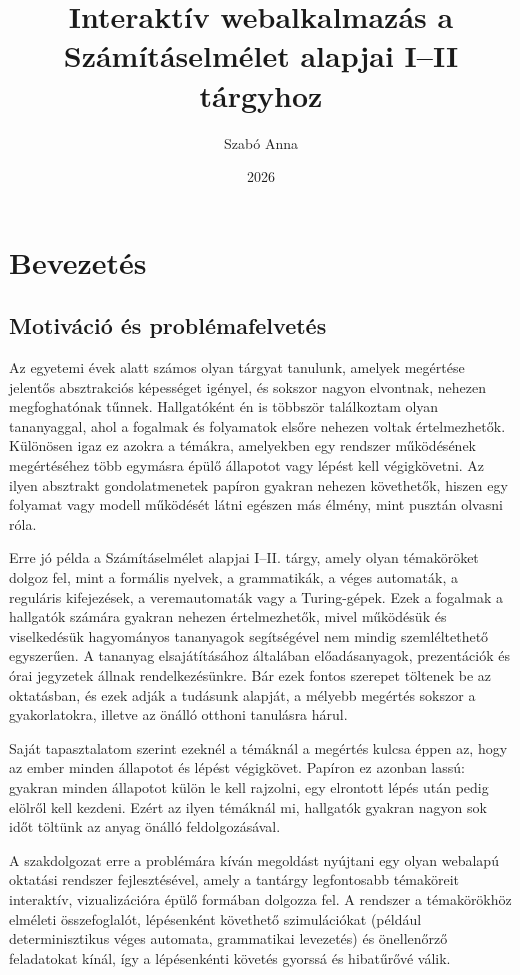 \documentclass[12pt,a4paper]{report}
\title{Interaktív webalkalmazás a Számításelmélet alapjai I–II tárgyhoz}
\author{Szabó Anna}
\date{2026}
\begin{document}
\maketitle

\tableofcontents

\chapter{Bevezetés}

\section{Motiváció és problémafelvetés}

Az egyetemi évek alatt számos olyan tárgyat tanulunk, amelyek megértése
jelentős absztrakciós képességet igényel, és sokszor nagyon elvontnak,
nehezen megfoghatónak tűnnek. Hallgatóként én is többször találkoztam olyan
tananyaggal, ahol a fogalmak és folyamatok elsőre nehezen voltak értelmezhetők.
Különösen igaz ez azokra a témákra, amelyekben egy rendszer működésének megértéséhez
több egymásra épülő állapotot vagy lépést kell végigkövetni.
Az ilyen absztrakt gondolatmenetek papíron gyakran nehezen követhetők,
hiszen egy folyamat vagy modell működését látni egészen más élmény,
mint pusztán olvasni róla.

Erre jó példa a Számításelmélet alapjai I--II. tárgy,
amely olyan témaköröket dolgoz fel, mint a formális nyelvek,
a grammatikák, a véges automaták, a reguláris kifejezések,
a veremautomaták vagy a Turing-gépek.
Ezek a fogalmak a hallgatók számára gyakran nehezen értelmezhetők, mivel
működésük és viselkedésük hagyományos tananyagok segítségével nem mindig
szemléltethető egyszerűen.
A tananyag elsajátításához általában előadásanyagok, prezentációk és
órai jegyzetek állnak rendelkezésünkre. Bár ezek fontos szerepet
töltenek be az oktatásban, és ezek adják a tudásunk alapját, a
mélyebb megértés sokszor a gyakorlatokra, illetve az önálló otthoni
tanulásra hárul.

Saját tapasztalatom szerint ezeknél a témáknál a megértés kulcsa
éppen az, hogy az ember minden állapotot és lépést végigkövet. Papíron
ez azonban lassú: gyakran minden állapotot külön le kell rajzolni, egy
elrontott lépés után pedig elölről kell kezdeni. Ezért az ilyen
témáknál mi, hallgatók gyakran nagyon sok időt töltünk az anyag önálló
feldolgozásával.

A szakdolgozat erre a problémára kíván megoldást nyújtani egy olyan
webalapú oktatási rendszer fejlesztésével, amely a tantárgy
legfontosabb témaköreit interaktív, vizualizációra épülő formában
dolgozza fel. A rendszer a témakörökhöz elméleti összefoglalót,
lépésenként követhető szimulációkat (például determinisztikus véges
automata, grammatikai levezetés) és önellenőrző feladatokat kínál,
így a lépésenkénti követés gyorssá és hibatűrővé válik.
\end{document}
